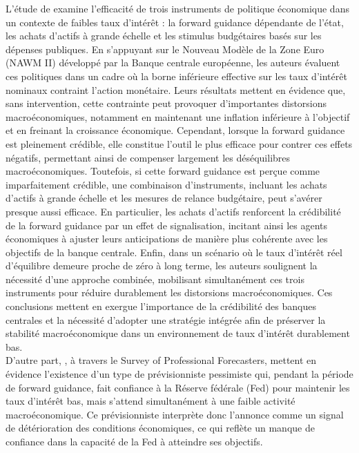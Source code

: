 L'étude de \citep{coenen2021macroeconomic} examine l'efficacité de trois instruments de politique économique dans un contexte de faibles taux d'intérêt : la forward guidance dépendante de l'état, les achats d'actifs à grande échelle et les stimulus budgétaires basés sur les dépenses publiques. En s'appuyant sur le Nouveau Modèle de la Zone Euro (NAWM II) développé par la Banque centrale européenne, les auteurs évaluent ces politiques dans un cadre où la borne inférieure effective sur les taux d'intérêt nominaux contraint l'action monétaire. Leurs résultats mettent en évidence que, sans intervention, cette contrainte peut provoquer d’importantes distorsions macroéconomiques, notamment en maintenant une inflation inférieure à l’objectif et en freinant la croissance économique. Cependant, lorsque la forward guidance est pleinement crédible, elle constitue l’outil le plus efficace pour contrer ces effets négatifs, permettant ainsi de compenser largement les déséquilibres macroéconomiques. Toutefois, si cette forward guidance est perçue comme imparfaitement crédible, une combinaison d’instruments, incluant les achats d’actifs à grande échelle et les mesures de relance budgétaire, peut s’avérer presque aussi efficace. En particulier, les achats d’actifs renforcent la crédibilité de la forward guidance par un effet de signalisation, incitant ainsi les agents économiques à ajuster leurs anticipations de manière plus cohérente avec les objectifs de la banque centrale. Enfin, dans un scénario où le taux d’intérêt réel d’équilibre demeure proche de zéro à long terme, les auteurs soulignent la nécessité d’une approche combinée, mobilisant simultanément ces trois instruments pour réduire durablement les distorsions macroéconomiques. Ces conclusions mettent en exergue l’importance de la crédibilité des banques centrales et la nécessité d’adopter une stratégie intégrée afin de préserver la stabilité macroéconomique dans un environnement de taux d’intérêt durablement bas.\\

D'autre part, \citep{andrade2019}, à travers le Survey of Professional Forecasters, mettent en évidence l'existence d'un type de prévisionniste pessimiste qui, pendant la période de forward guidance, fait confiance à la Réserve fédérale (Fed) pour maintenir les taux d'intérêt bas, mais s'attend simultanément à une faible activité macroéconomique. Ce prévisionniste interprète donc l’annonce comme un signal de détérioration des conditions économiques, ce qui reflète un manque de confiance dans la capacité de la Fed à atteindre ses objectifs.\\


